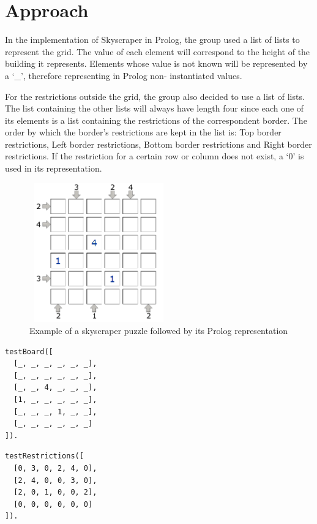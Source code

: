 \documentclass{llncs}
\begin{document}
%
\section{Approach}

In the implementation of Skyscraper in Prolog, the group used a list of lists to represent the grid. The value of each element will correspond to the height of the building it represents.
Elements whose value is not known will be represented by  a `\_', therefore representing in Prolog non- instantiated values.

For the restrictions outside the grid, the group also decided to use a list of lists. The list containing the other lists will always have length four since each one of its elements is a list containing the restrictions of the correspondent border. The order by which the border's restrictions are kept in the list is: Top border restrictions, Left border restrictions, Bottom border restrictions and Right border restrictions. If the restriction for a certain row or column does not exist, a `0' is used in its representation.

\begin{figure}[h!]
\begin{center}
\includegraphics[height=6cm,width=6cm]{images/example_skyscraper.png}
\caption{Example of a skyscraper puzzle followed by its Prolog representation}
\label{Figure 3}
\end{center}
\end{figure}
\noindent\begin{minipage}{.48\textwidth}
\begin{lstlisting}[frame=tlrb, caption=Prolog grid representation]
testBoard([
  [_, _, _, _, _, _],
  [_, _, _, _, _, _],
  [_, _, 4, _, _, _],
  [1, _, _, _, _, _],
  [_, _, _, 1, _, _],
  [_, _, _, _, _, _]
]).
\end{lstlisting}
\end{minipage}\hfill
\begin{minipage}{.42\textwidth}
\begin{lstlisting}[frame=tblr, caption=Prolog representation of border restrictions]
testRestrictions([
  [0, 3, 0, 2, 4, 0],
  [2, 4, 0, 0, 3, 0],
  [2, 0, 1, 0, 0, 2],
  [0, 0, 0, 0, 0, 0]
]).
\end{lstlisting}
\end{minipage}\hfill
\end{document}
